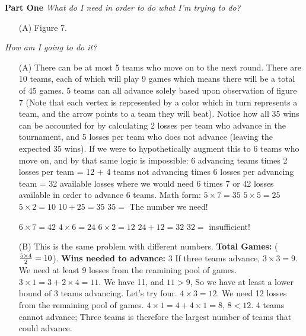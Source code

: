 \documentclass[12pt]{article}
\begin{document}
 
\textbf{Part One}\newline
\textit{What do I need in order to do what I'm trying to do?}\newline
 
\begin{enumerate}
\item[(A)] Figure 7.


\end{enumerate}
 
\textit{How am I going to do it?}\newline

\begin{enumerate}
\item[(A)] There can be at most 5 teams who move on to the next round. There are 10 teams, each of which will play 9 games which means there will be a total of 45 games. 5 teams can all advance solely based upon observation of figure 7 (Note that each vertex is represented by a color which in turn represents a team, and the arrow points to a team they will beat). Notice how all 35 wins can be accounted for by calculating 2 losses per team who advance in the tournament, and 5 losses per team who does not advance (leaving the expected 35 wins). If we were to hypothetically augment this to 6 teams who move on, and by that same logic is impossible: 6 advancing teams times 2 losses per team = 12 + 4 teams not advancing times 6 losses per advancing team = 32 available losses where we would need 6 times 7 or 42 losses available in order to advance 6 teams. \newline
Math form:\newline
 $5 \times 7 = 35$\newline
$5 \times 5 = 25$ \newline
$5\times2 = 10$ \newline
$10 + 25 = 35$ \newline
$35 = $ The number we need! \newline

$6\times7 = 42$\newline
$4\times6 = 24$ \newline
$6 \times 2 = 12 $ \newline
$24 + 12 = 32$ \newline
$32 = $ insufficient!

\item [(B)] This is the same problem with different numbers. \newline
\textbf{Total Games:} (${{5 \times 4}\over 2} = 10$). \newline
\textbf{Wins needed to advance:} 3 \newline
If three teams advance, $3 \times 3 = 9$. We need at least 9 losses from the reamining pool of games.  $3 \times 1 = 3 + 2 \times 4 = 11$. We have 11, and $11 > 9$,  So we have at least a lower bound of 3 teams advancing.\newline
Let's try four. \newline
$4 \times 3 = 12$. We need 12 losses from the remaining pool of games. $4 \times 1 = 4 + 4 \times 1 = 8$, $8 < 12$. 4 teams cannot advance; Three teams is therefore the largest number of teams that could advance.




\end{enumerate}
\end{document}
